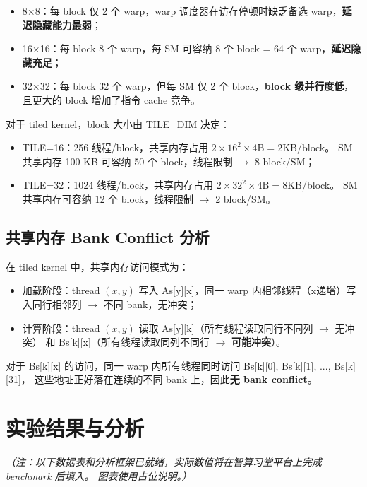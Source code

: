 \documentclass[UTF8,a4paper,12pt,fontset=none]{ctexart}
\begin{document}
\begin{itemize}
  \item 8×8：每 block 仅 2 个 warp，warp 调度器在访存停顿时缺乏备选 warp，\textbf{延迟隐藏能力最弱}；
  \item 16×16：每 block 8 个 warp，每 SM 可容纳 8 个 block = 64 个 warp，\textbf{延迟隐藏充足}；
  \item 32×32：每 block 32 个 warp，但每 SM 仅 2 个 block，\textbf{block 级并行度低}，且更大的
        block 增加了指令 cache 竞争。
\end{itemize}

对于 tiled kernel，block 大小由 TILE\_DIM 决定：
\begin{itemize}
  \item TILE=16：256 线程/block，共享内存占用 $2 \times 16^2 \times 4\text{B} = 2\text{KB}$/block。
        SM 共享内存 100 KB 可容纳 50 个 block，线程限制 $\rightarrow$ 8 block/SM；
  \item TILE=32：1024 线程/block，共享内存占用 $2 \times 32^2 \times 4\text{B} = 8\text{KB}$/block。
        SM 共享内存可容纳 12 个 block，线程限制 $\rightarrow$ 2 block/SM。
\end{itemize}

\subsection{共享内存 Bank Conflict 分析}

在 tiled kernel 中，共享内存访问模式为：
\begin{itemize}
  \item 加载阶段：thread $(x, y)$ 写入 As[y][x]，同一 warp 内相邻线程（x递增）写入同行相邻列
        $\to$ 不同 bank，无冲突；
  \item 计算阶段：thread $(x, y)$ 读取 As[y][k]（所有线程读取同行不同列 $\to$ 无冲突）
        和 Bs[k][x]（所有线程读取同列不同行 $\to$ \textbf{可能冲突}）。
\end{itemize}

对于 Bs[k][x] 的访问，同一 warp 内所有线程同时访问 Bs[k][0], Bs[k][1], ..., Bs[k][31]，
这些地址正好落在连续的不同 bank 上，因此\textbf{无 bank conflict}。

\section{实验结果与分析}

\textit{（注：以下数据表和分析框架已就绪，实际数值将在智算习堂平台上完成 benchmark 后填入。
图表使用占位说明。）}
\end{document}
